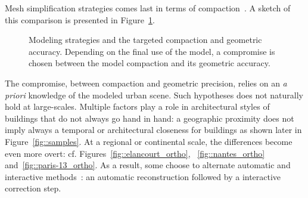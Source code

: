             Mesh simplification strategies comes last in terms of compaction~\parencite{zhou20102,verdie2015lod}.
            A sketch of this comparison is presented in Figure~\ref{fig::modeling_strategies}.\\
            \begin{figure}[htpb]
                \centering
                            
                \caption[
                    Modeling strategies and the targeted compaction and geometric accuracy.
                ]{
                    \label{fig::modeling_strategies}
                    Modeling strategies and the targeted compaction and geometric accuracy.
                    Depending on the final use of the model, a compromise is chosen between the model compaction and its geometric accuracy.
                }
            \end{figure}
            The compromise, between compaction and geometric precision, relies on an \textit{a priori} knowledge of the modeled urban scene.
            Such hypotheses does not naturally hold at large-scales.
            Multiple factors play a role in architectural styles of buildings that do not always go hand in hand:
            a geographic proximity does not imply always a temporal or architectural closeness for buildings as shown later in Figure~\ref{fig::samples}.
            At a regional or continental scale, the differences become even more overt: cf. Figures~\ref{fig::elancourt_ortho}, ~\ref{fig::nantes_ortho} and~\ref{fig::paris-13_ortho}.
            As a result, some choose to alternate automatic and interactive methods~\parencite{musialski2013survey}: an automatic reconstruction followed by a interactive correction step.
        
